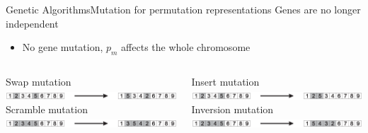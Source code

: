 \documentclass[10pt,compress]{beamer} %
\begin{document}
\begin{frame}{Genetic Algorithms}{Mutation for permutation representations}
	Genes are no longer independent
	\begin{itemize}
		\item No gene mutation, $p_m$ affects the whole chromosome
	\end{itemize}
    \begin{columns}
		\begin{center}
		Swap mutation\\
		\includegraphics[width=\linewidth]{figs/swap.eps}\\
		Scramble mutation\\
		\includegraphics[width=\linewidth]{figs/scramble.eps}\\
		\end{center}
		\begin{center}
		Insert mutation\\
		\includegraphics[width=\linewidth]{figs/insert.eps}\\
		Inversion mutation\\
		\includegraphics[width=\linewidth]{figs/inversion.eps}\\
		\end{center}
	   \end{columns}
\end{frame}
\end{document}
